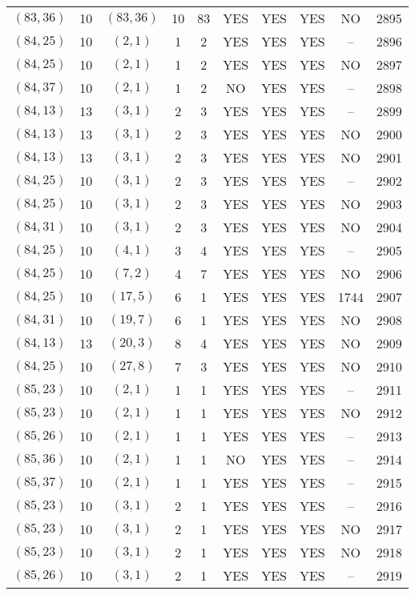 \begin{longtable}{|c|c|c|c|c|c|c|c|c|c|}
$(83, 36)$ & 10 & $(83, 36)$ & 10 & 83 & YES & YES & YES & NO & 2895\\
$(84, 25)$ & 10 & $(2, 1)$ & 1 & 2 & YES & YES & YES & -- & 2896\\
$(84, 25)$ & 10 & $(2, 1)$ & 1 & 2 & YES & YES & YES & NO & 2897\\
$(84, 37)$ & 10 & $(2, 1)$ & 1 & 2 & NO & YES & YES & -- & 2898\\
$(84, 13)$ & 13 & $(3, 1)$ & 2 & 3 & YES & YES & YES & -- & 2899\\
$(84, 13)$ & 13 & $(3, 1)$ & 2 & 3 & YES & YES & YES & NO & 2900\\
$(84, 13)$ & 13 & $(3, 1)$ & 2 & 3 & YES & YES & YES & NO & 2901\\
$(84, 25)$ & 10 & $(3, 1)$ & 2 & 3 & YES & YES & YES & -- & 2902\\
$(84, 25)$ & 10 & $(3, 1)$ & 2 & 3 & YES & YES & YES & NO & 2903\\
$(84, 31)$ & 10 & $(3, 1)$ & 2 & 3 & YES & YES & YES & NO & 2904\\
$(84, 25)$ & 10 & $(4, 1)$ & 3 & 4 & YES & YES & YES & -- & 2905\\
$(84, 25)$ & 10 & $(7, 2)$ & 4 & 7 & YES & YES & YES & NO & 2906\\
$(84, 25)$ & 10 & $(17, 5)$ & 6 & 1 & YES & YES & YES & 1744 & 2907\\
$(84, 31)$ & 10 & $(19, 7)$ & 6 & 1 & YES & YES & YES & NO & 2908\\
$(84, 13)$ & 13 & $(20, 3)$ & 8 & 4 & YES & YES & YES & NO & 2909\\
$(84, 25)$ & 10 & $(27, 8)$ & 7 & 3 & YES & YES & YES & NO & 2910\\
$(85, 23)$ & 10 & $(2, 1)$ & 1 & 1 & YES & YES & YES & -- & 2911\\
$(85, 23)$ & 10 & $(2, 1)$ & 1 & 1 & YES & YES & YES & NO & 2912\\
$(85, 26)$ & 10 & $(2, 1)$ & 1 & 1 & YES & YES & YES & -- & 2913\\
$(85, 36)$ & 10 & $(2, 1)$ & 1 & 1 & NO & YES & YES & -- & 2914\\
$(85, 37)$ & 10 & $(2, 1)$ & 1 & 1 & YES & YES & YES & -- & 2915\\
$(85, 23)$ & 10 & $(3, 1)$ & 2 & 1 & YES & YES & YES & -- & 2916\\
$(85, 23)$ & 10 & $(3, 1)$ & 2 & 1 & YES & YES & YES & NO & 2917\\
$(85, 23)$ & 10 & $(3, 1)$ & 2 & 1 & YES & YES & YES & NO & 2918\\
$(85, 26)$ & 10 & $(3, 1)$ & 2 & 1 & YES & YES & YES & -- & 2919\\

\end{longtable}
